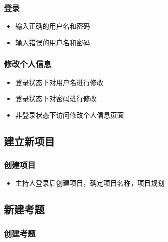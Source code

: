 \documentclass[hyperref, a4paper]{ctexart}
\providecommand{\tightlist}{%
  \setlength{\itemsep}{0pt}\setlength{\parskip}{0pt}}
\begin{document}
\hypertarget{ux767bux5f55}{%
\subsubsection{登录}\label{ux767bux5f55}}

\begin{itemize}
\tightlist
\item
  输入正确的用户名和密码
\item
  输入错误的用户名和密码
\end{itemize}

\hypertarget{ux4feeux6539ux4e2aux4ebaux4fe1ux606f}{%
\subsubsection{修改个人信息}\label{ux4feeux6539ux4e2aux4ebaux4fe1ux606f}}

\begin{itemize}
\tightlist
\item
  登录状态下对用户名进行修改
\item
  登录状态下对密码进行修改
\item
  非登录状态下访问修改个人信息页面
\end{itemize}

\hypertarget{ux5efaux7acbux65b0ux9879ux76ee}{%
\subsection{建立新项目}\label{ux5efaux7acbux65b0ux9879ux76ee}}

\hypertarget{ux521bux5efaux9879ux76ee}{%
\subsubsection{创建项目}\label{ux521bux5efaux9879ux76ee}}

\begin{itemize}
\tightlist
\item
  主持人登录后创建项目，确定项目名称，项目规划
\end{itemize}

\hypertarget{ux65b0ux5efaux8003ux9898}{%
\subsection{新建考题}\label{ux65b0ux5efaux8003ux9898}}

\hypertarget{ux521bux5efaux8003ux9898}{%
\subsubsection{创建考题}\label{ux521bux5efaux8003ux9898}}
\end{document}
